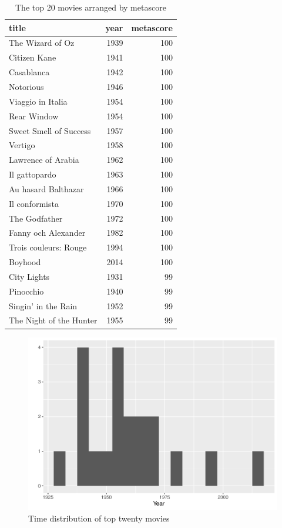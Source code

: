 \documentclass[11pt,a4paper,]{article}
\begin{document}
\begin{table}

\caption{\label{tab:toptwentytable}The top 20 movies arranged by metascore}
\centering
\begin{tabular}[t]{l|r|r}
\hline
title & year & metascore\\
\hline
The Wizard of Oz & 1939 & 100\\
\hline
Citizen Kane & 1941 & 100\\
\hline
Casablanca & 1942 & 100\\
\hline
Notorious & 1946 & 100\\
\hline
Viaggio in Italia & 1954 & 100\\
\hline
Rear Window & 1954 & 100\\
\hline
Sweet Smell of Success & 1957 & 100\\
\hline
Vertigo & 1958 & 100\\
\hline
Lawrence of Arabia & 1962 & 100\\
\hline
Il gattopardo & 1963 & 100\\
\hline
Au hasard Balthazar & 1966 & 100\\
\hline
Il conformista & 1970 & 100\\
\hline
The Godfather & 1972 & 100\\
\hline
Fanny och Alexander & 1982 & 100\\
\hline
Trois couleurs: Rouge & 1994 & 100\\
\hline
Boyhood & 2014 & 100\\
\hline
City Lights & 1931 & 99\\
\hline
Pinocchio & 1940 & 99\\
\hline
Singin' in the Rain & 1952 & 99\\
\hline
The Night of the Hunter & 1955 & 99\\
\hline
\end{tabular}
\end{table}

\begin{figure}
\centering
\includegraphics{Report_files/figure-latex/toptwentyhistogram-1.pdf}
\caption{\label{fig:toptwentyhistogram}Time distribution of top twenty movies}
\end{figure}
\end{document}
